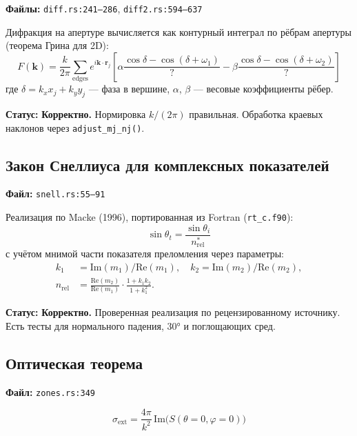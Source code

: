 \documentclass[12pt,a4paper]{article}
\begin{document}
\textbf{Файлы:} \texttt{diff.rs:241--286}, \texttt{diff2.rs:594--637}

Дифракция на апертуре вычисляется как контурный интеграл по рёбрам апертуры
(теорема Грина для 2D):
\[
  F(\mathbf{k}) = \frac{k}{2\pi} \sum_{\text{edges}} e^{i \mathbf{k} \cdot \mathbf{r}_j}
  \left[ \alpha \frac{\cos\delta - \cos(\delta+\omega_1)}{?}
       - \beta  \frac{\cos\delta - \cos(\delta+\omega_2)}{?} \right]
\]
где $\delta = k_x x_j + k_y y_j$ --- фаза в вершине, $\alpha$, $\beta$ --- весовые коэффициенты рёбер.

\textbf{Статус:} \textcolor{green!50!black}{\textbf{Корректно.}}
Нормировка $k/(2\pi)$ правильная. Обработка краевых наклонов через \texttt{adjust\_mj\_nj()}.

\subsection{Закон Снеллиуса для комплексных показателей}

\textbf{Файл:} \texttt{snell.rs:55--91}

Реализация по Macke (1996), портированная из Fortran (\texttt{rt\_c.f90}):
\[
  \sin\theta_t = \frac{\sin\theta_i}{n_{\mathrm{rel}}^*}
\]
с учётом мнимой части показателя преломления через параметры:
\begin{align}
  k_1 &= \mathrm{Im}(m_1)/\mathrm{Re}(m_1), \quad
  k_2 = \mathrm{Im}(m_2)/\mathrm{Re}(m_2), \\
  n_{\mathrm{rel}} &= \frac{\mathrm{Re}(m_2)}{\mathrm{Re}(m_1)} \cdot
    \frac{1 + k_1 k_2}{1 + k_1^2}.
\end{align}

\textbf{Статус:} \textcolor{green!50!black}{\textbf{Корректно.}}
Проверенная реализация по рецензированному источнику. Есть тесты для нормального падения,
$30°$ и поглощающих сред.

\subsection{Оптическая теорема}

\textbf{Файл:} \texttt{zones.rs:349}

\[
  \sigma_{\mathrm{ext}} = \frac{4\pi}{k^2}\, \mathrm{Im}\bigl(S(\theta=0, \varphi=0)\bigr)
\]
\end{document}
